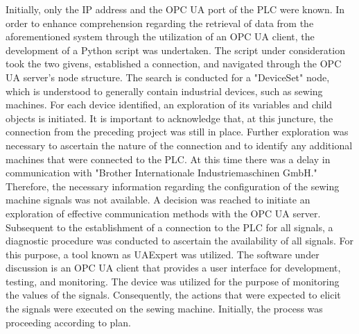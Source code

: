 Initially, only the IP address and the OPC UA port of the PLC were known. In order to enhance comprehension regarding the retrieval of data from the aforementioned system through the utilization of an OPC UA client, the development of a Python script was undertaken. The script under consideration took the two givens, established a connection, and navigated through the OPC UA server's node structure. The search is conducted for a "DeviceSet" node, which is understood to generally contain industrial devices, such as sewing machines. For each device identified, an exploration of its variables and child objects is initiated. It is important to acknowledge that, at this juncture, the connection from the preceding project was still in place. Further exploration was necessary to ascertain the nature of the connection and to identify any additional machines that were connected to the PLC. At this time there was a delay in communication with "Brother Internationale Industriemaschinen GmbH." Therefore, the necessary information regarding the configuration of the sewing machine signals was not available. A decision was reached to initiate an exploration of effective communication methods with the OPC UA server.\\
Subsequent to the establishment of a connection to the PLC for all signals, a diagnostic procedure was conducted to ascertain the availability of all signals. For this purpose, a tool known as UAExpert was utilized. The software under discussion is an OPC UA client that provides a user interface for development, testing, and monitoring. The device was utilized for the purpose of monitoring the values of the signals. Consequently, the actions that were expected to elicit the signals were executed on the sewing machine. Initially, the process was proceeding according to plan.

